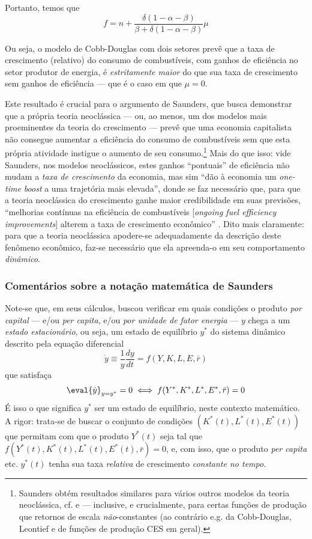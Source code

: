 Portanto, temos que 
$$
f = n + \frac{\delta (1-\alpha-\beta)}{\beta+\delta(1-\alpha-\beta)} \mu
$$

Ou seja, o modelo de Cobb-Douglas com dois setores prevê que a taxa de crescimento (relativo) do consumo de combustíveis, com ganhos de eficiência no setor produtor de energia, é \textit{estritamente maior} do que sua taxa de crescimento sem ganhos de eficiência --- que é o caso em que $\mu=0$. 

Este resultado é crucial para o argumento de Saunders, que busca demonstrar que a própria teoria neoclássica --- ou, ao menos, um dos modelos mais proeminentes da teoria do crescimento --- prevê que uma economia capitalista não consegue aumentar a eficiência do consumo de combustíveis sem que esta própria atividade instigue o aumento de seu consumo.\footnote{Saunders obtém resultados similares para vários outros modelos da teoria neoclássica, cf. \textcite{Saunders2000} e \textcite{Saunders2008} --- inclusive, e crucialmente, para certas funções de produção que retornos de escala \textit{não}-constantes (ao contrário e.g. da Cobb-Douglas, Leontief e de funções de produção CES em geral).} Mais do que isso: vide Saunders, nos modelos neoclássicos, estes ganhos ``pontuais'' de eficiência não mudam a \textit{taxa de crescimento} da economia, mas sim ``dão à economia um \textit{one-time boost} a uma trajetória mais elevada'', donde se faz necessário que, para que a teoria neoclássica do crescimento ganhe maior credibilidade em suas previsões, ``melhorias contínuas na eficiência de combustíveis [\textit{ongoing fuel efficiency improvements}] alterem a taxa de crescimento econômico'' \parencite[p. 444]{Saunders2000}. Dito mais claramente: para que a teoria neoclássica apodere-se adequadamente da descrição deste fenômeno econômico, faz-se necessário que ela apreenda-o em seu comportamento \textit{dinâmico}. 


\subsubsection{Comentários sobre a notação matemática de Saunders}
Note-se que, em seus cálculos, \textcite{Saunders1992} buscou verificar em quais condições o produto \textit{por capital} --- e/ou \textit{per capita}, e/ou \textit{por unidade de fator energia} --- $y$ chega a um \textit{estado estacionário}, ou seja, um estado de equilíbrio $y^*$ do sistema dinâmico descrito pela equação diferencial
$$
\dot{y} \equiv \frac{1}{y} \frac{dy}{dt} = f(Y, K, L, E, \bar{r})
$$
que satisfaça
$$
\eval{\dot{y}}_{y=y^*} = 0 \iff f(Y^*, K^*, L^*, E^*, \bar{r}) = 0
$$
É isso o que significa $y^*$ ser um estado de equilíbrio, neste contexto matemático. A rigor: trata-se de buscar o conjunto de condições $(K^*(t), L^*(t), E^*(t))$ que permitam com que o produto $Y^*(t)$ seja tal que $f(Y^*(t), K^*(t), L^*(t), E^*(t), \bar{r}) = 0$, e, com isso, que o produto \textit{per capita} etc. $y^*(t)$ tenha sua taxa \textit{relativa} de crescimento \textit{constante no tempo}.

